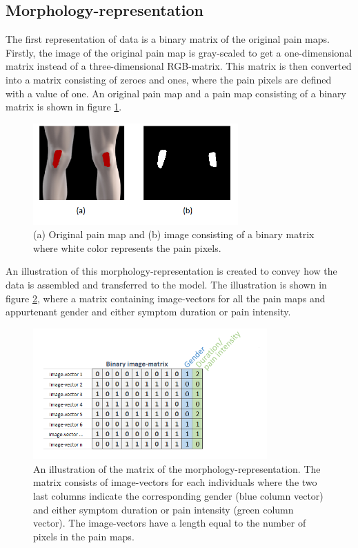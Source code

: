 \subsection{Morphology-representation} \label{sec:Morph}
The first representation of data is a binary matrix of the original pain maps.
Firstly, the image of the original pain map is gray-scaled to get a one-dimensional matrix instead of a three-dimensional RGB-matrix. This matrix is then converted into a matrix consisting of zeroes and ones, where the pain pixels are defined with a value of one. An original pain map and a pain map consisting of a binary matrix is shown in figure \ref{fig:cropbin7}.

\begin{figure} [H]
\centering
\includegraphics[width=0.7\textwidth]{figures/cropbin7}
\caption{(a) Original pain map and (b) image consisting of a binary matrix where white color represents the pain pixels.}
\label{fig:cropbin7}
\end{figure}

\noindent
An illustration of this morphology-representation is created to convey how the data is assembled and transferred to the model. The illustration is shown in figure \ref{fig:binmatrix}, where a matrix containing image-vectors for all the pain maps and appurtenant gender and either symptom duration or pain intensity.

\begin{figure} [H]
\centering
\includegraphics[width=0.8\textwidth]{figures/binaryimagematrix}
\caption{An illustration of the matrix of the morphology-representation. The matrix consists of image-vectors for each individuals where the two last columns indicate the corresponding gender (blue column vector) and either symptom duration or pain intensity (green column vector). The image-vectors have a length equal to the number of pixels in the pain maps.}
\label{fig:binmatrix}
\end{figure}


